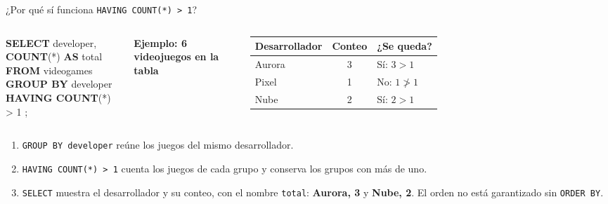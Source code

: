 \documentclass[aspectratio=169,10pt,c]{beamer}
\newcommand{\kw}[1]{\textcolor{utpRojo}{\textbf{#1}}}
\newcommand{\nuevo}[1]{{%
  \setlength{\fboxsep}{1.2pt}%
  \begingroup
  \renewcommand{\kw}[1]{\textcolor{utpNegro}{\textbf{##1}}}%
  \colorbox{yellow!45}{\textcolor{utpNegro}{#1}}%
  \endgroup}}
\newenvironment{sqlcode}[1][.86\textwidth]
  {\begin{center}\begin{lrbox}{\sqlbuf}\begin{minipage}{#1}\ttfamily\footnotesize\vspace{6pt}\raggedright}
  {\vspace{6pt}\end{minipage}\end{lrbox}\colorbox{utpGrisClaro}{\usebox{\sqlbuf}}\end{center}}
\begin{document}
\begin{frame}{¿Por qué sí funciona \texttt{HAVING COUNT(*) > 1}?}
\begin{columns}[c,onlytextwidth]
\begin{sqlcode}[\dimexpr\textwidth-2\fboxsep\relax]
\kw{SELECT} developer, \kw{COUNT}(*) \kw{AS} total\\
\kw{FROM} videogames\\
\kw{GROUP BY} developer\\
\nuevo{\kw{HAVING COUNT}(*) > 1};
\end{sqlcode}
\small\textbf{Ejemplo: 6 videojuegos en la tabla}
\vspace{0.15cm}

\renewcommand{\arraystretch}{1.3}
\begin{tabular}{@{}lcl@{}}
\toprule
\textbf{Desarrollador} & \textbf{Conteo} & \textbf{¿Se queda?} \\
\midrule
Aurora & 3 & Sí: $3 > 1$ \\
Pixel & 1 & No: $1 \not> 1$ \\
Nube & 2 & Sí: $2 > 1$ \\
\bottomrule
\end{tabular}
\end{columns}
\vspace{0.2cm}
\small
\begin{enumerate}\setlength\itemsep{5pt}
  \item \texttt{GROUP BY developer} reúne los juegos del mismo desarrollador.
  \item \texttt{HAVING COUNT(*) > 1} cuenta los juegos de cada grupo y conserva los grupos con más de uno.
  \item \texttt{SELECT} muestra el desarrollador y su conteo, con el nombre \texttt{total}: \textbf{Aurora, 3} y \textbf{Nube, 2}. El orden no está garantizado sin \texttt{ORDER BY}.
\end{enumerate}
\vspace{0.1cm}
\end{frame}
\end{document}
